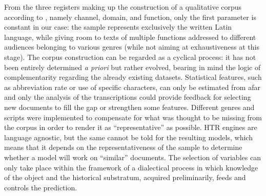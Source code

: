 \documentclass{article}
\begin{document}
From the three registers making up the construction of a qualitative corpus according to \cite{bauer2000corpus}, namely channel, domain, and function, only the first parameter is constant in our case: the sample represents exclusively the written Latin language, while giving room to texts of multiple functions addressed to different audiences belonging to various genres (while not aiming at exhaustiveness at this stage). The corpus construction can be regarded as a cyclical process: it has not been entirely determined \textit{a priori} but rather evolved, bearing in mind the logic of complementarity regarding the already existing datasets. Statistical features, such as abbreviation rate or use of specific characters, can only be estimated from afar and only the analysis of the transcriptions could provide feedback for selecting new documents to fill the gap or strengthen some features. Different genres and scripts were implemented to compensate for what was thought to be missing from the corpus in order to render it as \enquote{representative} as possible. HTR engines are language agnostic, but the same cannot be told for the resulting models, which means that it depends on the representativeness of the sample to determine whether a model will work on ``similar'' documents. The selection of variables can only take place within the framework of a dialectical process in which knowledge of the object and the historical substratum, acquired preliminarily, feeds and controls the prediction.

\end{document}

